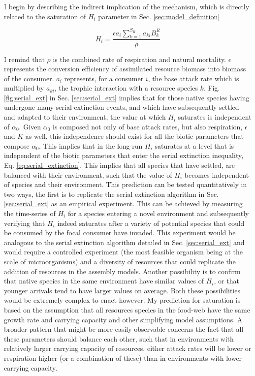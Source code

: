 \documentclass[a4paper]{report}
\begin{document}
I begin by describing the indirect implication of the mechanism, which is directly related to the saturation of $H_i$ parameter in Sec. \ref{sec:model_definition}

\begin{equation}
H_i=\frac{\epsilon a_i \sum_{k=1}^{S_R}a_{ki}B^R_k}{\rho}
\end{equation}

I remind that $\rho$ is the combined rate of respiration and natural mortality. $\epsilon$ represents the conversion efficiency of assimilated resource biomass into biomass of the consumer. $a_i$ represents, for a consumer $i$, the base attack rate which is multiplied by $a_{ki}$, the trophic interaction with a resource species $k$. Fig. \ref{fig:serial_ext} in Sec. \ref{sec:serial_ext} implies that for those native species having undergone many serial extinction events, and which have subsequently settled and adapted to their environment, the value at which $H_i$ saturates is independent of $\alpha_0$. Given $\alpha_0$ is composed not only of base attack rates, but also respiration, $\epsilon $ and $K$ as well, this independence should exist for all the biotic parameters that compose $\alpha_0$. This implies that in the long-run $H_i$ saturates at a level that is independent of the biotic parameters that enter the serial extinction inequality, Eq. \eqref{eq:serial_extinction}. This implies that all species that have settled, are balanced with their environment, such that the value of $H_i$ becomes independent of species and their environment. This prediction can be tested quantitatively in two ways, the first is to replicate the serial extinction algorithm in Sec. \ref{sec:serial_ext} as an empirical experiment. This can be achieved by measuring the time-series of $H_i$ for a species entering a novel environment and subsequently verifying that $H_i$ indeed saturates after a variety of potential species that could be consumed by the focal consumer have invaded. This experiment would be analogous to the serial extinction algorithm detailed in Sec. \ref{sec:serial_ext} and would require a controlled experiment (the most feasible organism being at the scale of microorganisms) and a diversity of resources that could replicate the addition of resources in the assembly models. Another possibility is to confirm that native species in the same environment have similar values of $H_i$, or that younger arrivals tend to have larger values on average. Both these possibilities would be extremely complex to enact however. My prediction for saturation is based on the assumption that all resources species in the food-web have the same growth rate and carrying capacity and other simplifying model assumptions. A broader pattern that might be more easily observable concerns the fact that all these parameters should balance each other, such that in environments with relatively larger carrying capacity of resources, either attack rates will be lower or respiration higher (or a combination of these) than in environments with lower carrying capacity. 
\end{document}

